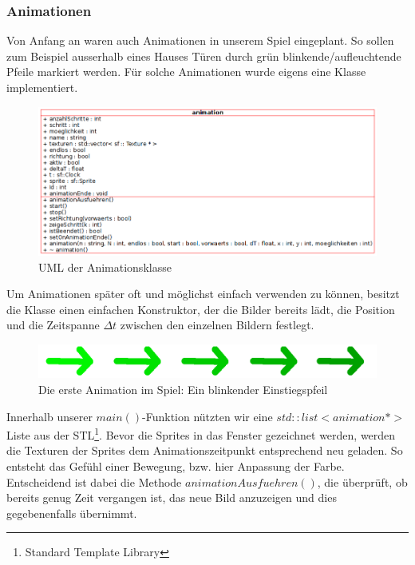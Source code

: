 \documentclass[12pt,a4paper]{scrartcl}
\begin{document}
\subsubsection{Animationen}
Von Anfang an waren auch Animationen in unserem Spiel eingeplant. So sollen zum Beispiel ausserhalb eines Hauses
Türen durch grün blinkende/aufleuchtende Pfeile markiert werden. Für solche Animationen wurde eigens eine Klasse
implementiert.
\begin{figure}[h]
	\centering
	\includegraphics[scale=0.6]{img/animation_uml.png}
	\caption{UML der Animationsklasse}
\end{figure}
Um Animationen später oft und möglichst einfach verwenden zu können, besitzt die Klasse einen einfachen Konstruktor,
der die Bilder bereits lädt, die Position und die Zeitspanne $\Delta t$ zwischen den einzelnen Bildern festlegt.
\begin{figure}[h]
	\centering
	\includegraphics[scale=0.3]{img/animation_pfeil.png}
	\caption{Die erste Animation im Spiel: Ein blinkender Einstiegspfeil}
\end{figure}
Innerhalb unserer $main()$-Funktion nützten wir eine $std::list<animation *>$ Liste aus der STL\footnote{Standard Template Library}.
Bevor die Sprites in das Fenster gezeichnet werden, werden die Texturen der Sprites dem Animationszeitpunkt entsprechend
neu geladen. So entsteht das Gefühl einer Bewegung, bzw. hier Anpassung der Farbe. Entscheidend ist dabei die Methode
$animationAusfuehren()$, die überprüft, ob bereits genug Zeit vergangen ist, das neue Bild anzuzeigen und dies gegebenenfalls
übernimmt.
\end{document}
